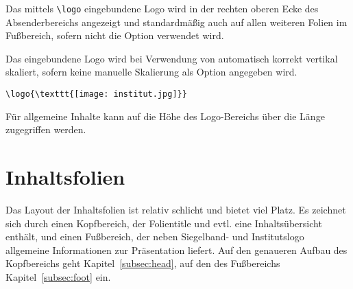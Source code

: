 Das mittels \lstinline{\logo} eingebundene Logo wird in der rechten oberen
Ecke des Absenderbereichs angezeigt und standardmäßig auch auf allen weiteren
Folien im Fußbereich, sofern nicht die Option 
verwendet wird.

Das eingebundene Logo wird bei Verwendung von 
automatisch korrekt vertikal skaliert,
sofern keine manuelle Skalierung als Option angegeben wird.


\begin{example}
\begin{lstlisting}
\logo{\texttt{[image: institut.jpg]}}
\end{lstlisting}
\end{example}

\begin{Declaration}
\end{Declaration}

Für allgemeine Inhalte kann auf die Höhe des Logo-Bereichs über die Länge
 zugegriffen werden.

\section{Inhaltsfolien}

Das Layout der Inhaltsfolien ist relativ schlicht und bietet viel Platz.
Es zeichnet sich durch einen Kopfbereich, der Folientitle und evtl. eine
Inhaltsübersicht enthält, und einen Fußbereich, der neben Siegelband- und
Institutslogo allgemeine Informationen zur Präsentation liefert.
Auf den genaueren Aufbau des Kopfbereichs geht Kapitel~\ref{subsec:head},
auf den des Fußbereichs Kapitel~\ref{subsec:foot} ein.

